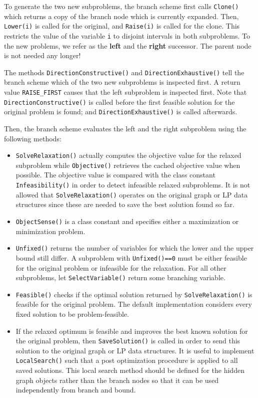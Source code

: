 \documentclass[a4paper,11pt,twoside]{book}
\begin{document}
\begin{multicols}{2}
To generate the two new subproblems, the branch scheme first calls
\verb/Clone()/ which returns a copy of the branch node which is currently
expanded. Then, \verb/Lower(i)/ is called for the original, and \verb/Raise(i)/
is called for the clone. This restricts the value of the variable \verb/i/ to
disjoint intervals in both subproblems. To the new problems, we
refer as the {\bf left}  and the
{\bf right} successor. The parent node
is not needed any longer!

The methods \verb/DirectionConstructive()/ and \verb/DirectionExhaustive()/
tell the branch scheme which of the two new subproblems is inspected first.
A return value \verb/RAISE_FIRST/ causes that the left subproblem is inspected
first.
Note that \verb/DirectionConstructive()/ is called before the first feasible
solution for the original problem is found; and \verb/DirectionExhaustive()/
is called afterwards.

Then, the branch scheme evaluates the left and the right subproblem using the
following methods:
\begin{itemize}
\item \verb/SolveRelaxation()/ actually computes the objective value for the
relaxed subproblem while \verb/Objective()/ retrieves the cached objective
value when possible. The objective value is compared with the class constant
\verb/Infeasibility()/ in order to detect infeasible relaxed subproblems.
It is not allowed that \verb/SolveRelaxation()/ operates on the original graph
or LP data structures since these are needed to save the best solution found
so far.
\item \verb/ObjectSense()/ is a class constant and specifies either a
maximization or minimization problem.
\item \verb/Unfixed()/ returns the number of variables for which the lower and
the upper bound still differ. A subproblem with \verb/Unfixed()==0/ must be
either feasible for the original problem or infeasible for the relaxation.
For all other subproblems, let \verb/SelectVariable()/ return some branching
variable.
\item \verb/Feasible()/ checks if the optimal solution returned by
\verb/SolveRelaxation()/ is feasible for the original problem. The default
implementation considers every fixed solution to be problem-feasible.
\item If the relaxed optimum is feasible and improves the best known solution
for the original problem, then \verb/SaveSolution()/ is called in order to send
this solution to the original graph or LP data structures. It is useful to
implement \verb/LocalSearch()/ such that a post optimization procedure is
applied to all saved solutions. This local search method should be
defined for the hidden graph objects rather than the branch nodes so that it
can be used independently from branch and bound.
\end{itemize}


\end{multicols}
\end{document}
